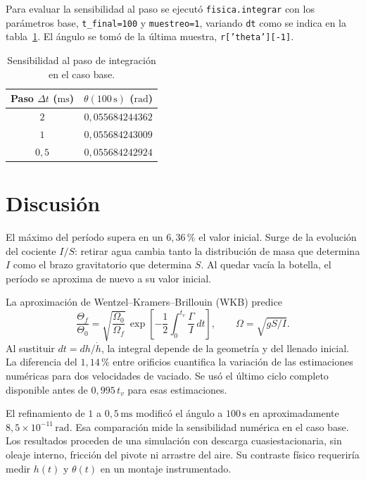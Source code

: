 \documentclass[11pt,a4paper]{article}
\begin{document}
Para evaluar la sensibilidad al paso se ejecutó \texttt{fisica.integrar}
con los parámetros base, \texttt{t\_final=100} y \texttt{muestreo=1},
variando \texttt{dt} como se indica en la tabla~\ref{tab:paso}.
El ángulo se tomó de la última muestra, \texttt{r['theta'][-1]}.

\begin{table}[htbp]
\centering
\caption{Sensibilidad al paso de integración en el caso base.}
\label{tab:paso}
\begin{tabular}{cc}
\toprule
Paso \(\Delta t\) (\(\mathrm{ms}\)) & \(\theta(100\,\mathrm{s})\) (\(\mathrm{rad}\)) \\
\midrule
\(2\)   & \(0{,}055684244362\) \\
\(1\)   & \(0{,}055684243009\) \\
\(0{,}5\) & \(0{,}055684242924\) \\
\bottomrule
\end{tabular}
\end{table}

\section{Discusión}
El máximo del período supera en un \(6{,}36\,\%\) el valor inicial.
Surge de la evolución del cociente \(I/S\): retirar agua cambia tanto
la distribución de masa que determina \(I\) como el brazo gravitatorio
que determina \(S\). Al quedar vacía la botella, el período se aproxima de
nuevo a su valor inicial.

La aproximación de Wentzel--Kramers--Brillouin (WKB) predice
\[
 \frac{\Theta_f}{\Theta_0}=\sqrt{\frac{\Omega_0}{\Omega_f}}\,
 \exp\!\left[-\frac12\int_0^{t_v}\frac{\Gamma}{I}\,dt\right],
 \qquad \Omega=\sqrt{gS/I}.
\] Al sustituir \(dt=dh/\dot h\), la integral depende
de la geometría y del llenado inicial. La diferencia del \(1{,}14\,\%\)
entre orificios cuantifica la variación de las estimaciones numéricas
para dos velocidades de vaciado. Se usó el último ciclo completo
disponible antes de \(0{,}995\,t_v\) para esas estimaciones.

El refinamiento de \(1\) a \(0{,}5\,\mathrm{ms}\) modificó el ángulo a
\(100\,\mathrm{s}\) en aproximadamente \(8{,}5\times10^{-11}\,\mathrm{rad}\).
Esa comparación mide la sensibilidad numérica en el caso base. Los
resultados proceden de una simulación con descarga cuasiestacionaria,
sin oleaje interno, fricción del pivote ni arrastre del aire. Su
contraste físico requeriría medir \(h(t)\) y \(\theta(t)\) en un montaje
instrumentado.
\end{document}

